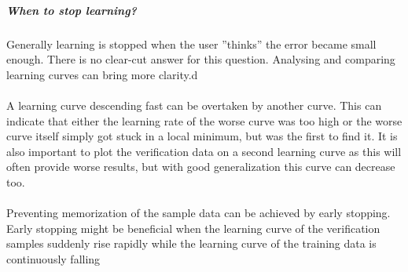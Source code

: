 \documentclass[pdftex,a4paper,12pt,twoside]{report}
\theoremstyle{plain} \newtheorem{theorem}{Theorem} \newtheorem{proposition}{Proposition} \newtheorem{lemma}{Lemma} \newtheorem*{corollary}{Corollary}
\theoremstyle{definition} \newtheorem{definition}{Definition} \newtheorem{conjecture}{Conjecture} \newtheorem*{example}{Example} \newtheorem{algorithm}{Algorithm}
\theoremstyle{remark} \newtheorem*{remark}{Remark} \newtheorem*{note}{Note} \newtheorem{case}{Case}
\begin{document}
\subparagraph{When to stop learning?}
Generally learning is stopped when the user ''thinks'' the error became small enough. There is no clear-cut answer for this question. Analysing and comparing learning curves can bring more clarity.d\\\\A learning curve descending fast can be overtaken by another curve. This can indicate that either the learning rate of the worse curve was too high or the worse curve itself simply got stuck in a local minimum, but was the first to find it. It is also important to plot the verification data on a second learning curve as this will often provide worse results, but with good generalization this curve can decrease too.\\\\Preventing memorization of the sample data can be achieved by early stopping. Early stopping might be beneficial when the learning curve of the verification samples suddenly rise rapidly while the learning curve of the training data is continuously falling
\end{document}

